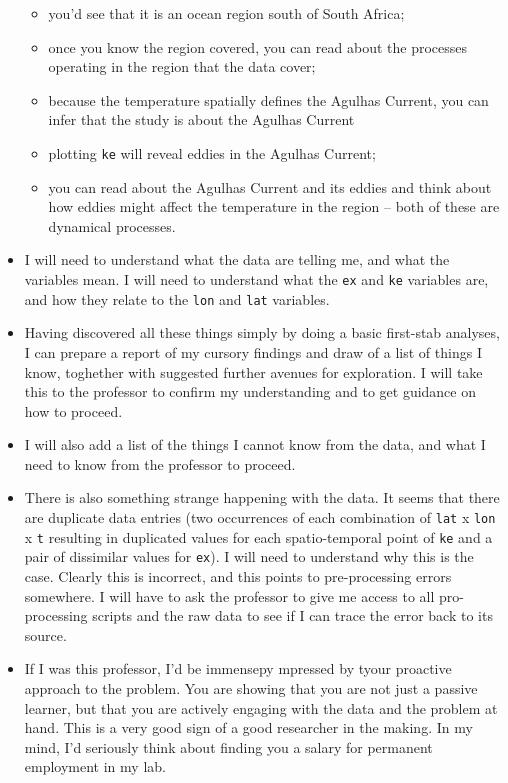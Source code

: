 \documentclass[
  10t,
]{article}
\providecommand{\tightlist}{%
  \setlength{\itemsep}{0pt}\setlength{\parskip}{0pt}}
\let\oldtexttt\texttt
\renewcommand{\texttt}[1]{\oldtexttt{\small #1}}
\begin{document}
\begin{itemize}
  \begin{itemize}
  \tightlist
  \item
    you'd see that it is an ocean region south of South Africa;
  \item
    once you know the region covered, you can read about the processes
    operating in the region that the data cover;
  \item
    because the temperature spatially defines the Agulhas Current, you
    can infer that the study is about the Agulhas Current
  \item
    plotting \texttt{ke} will reveal eddies in the Agulhas Current;
  \item
    you can read about the Agulhas Current and its eddies and think
    about how eddies might affect the temperature in the region -- both
    of these are dynamical processes.
  \end{itemize}
\item
  I will need to understand what the data are telling me, and what the
  variables mean. I will need to understand what the \texttt{ex} and
  \texttt{ke} variables are, and how they relate to the \texttt{lon} and
  \texttt{lat} variables.
\item
  Having discovered all these things simply by doing a basic first-stab
  analyses, I can prepare a report of my cursory findings and draw of a
  list of things I know, toghether with suggested further avenues for
  exploration. I will take this to the professor to confirm my
  understanding and to get guidance on how to proceed.
\item
  I will also add a list of the things I cannot know from the data, and
  what I need to know from the professor to proceed.
\item
  There is also something strange happening with the data. It seems that
  there are duplicate data entries (two occurrences of each combination
  of \texttt{lat} x \texttt{lon} x \texttt{t} resulting in duplicated
  values for each spatio-temporal point of \texttt{ke} and a pair of
  dissimilar values for \texttt{ex}). I will need to understand why this
  is the case. Clearly this is incorrect, and this points to
  pre-processing errors somewhere. I will have to ask the professor to
  give me access to all pro-processing scripts and the raw data to see
  if I can trace the error back to its source.
\item
  If I was this professor, I'd be immensepy mpressed by tyour proactive
  approach to the problem. You are showing that you are not just a
  passive learner, but that you are actively engaging with the data and
  the problem at hand. This is a very good sign of a good researcher in
  the making. In my mind, I'd seriously think about finding you a salary
  for permanent employment in my lab.
\end{itemize}
\end{document}
